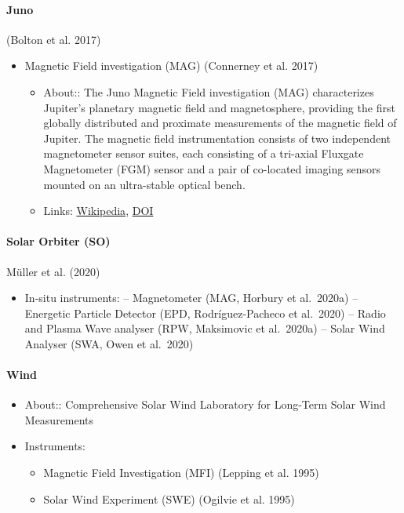 \documentclass[
  letterpaper,
  DIV=11,
  numbers=noendperiod,
  oneside]{scrartcl}
\let\oldparagraph\paragraph
\renewcommand{\paragraph}[1]{\oldparagraph{#1}\mbox{}}
\providecommand{\tightlist}{%
  \setlength{\itemsep}{0pt}\setlength{\parskip}{0pt}}\usepackage{longtable,booktabs,array}
\begin{document}
\paragraph{Juno}

(Bolton et al. 2017)

\begin{itemize}
\tightlist
\item
  Magnetic Field investigation (MAG) (Connerney et al. 2017)

  \begin{itemize}
  \tightlist
  \item
    About:: The Juno Magnetic Field investigation (MAG) characterizes
    Jupiter's planetary magnetic field and magnetosphere, providing the
    first globally distributed and proximate measurements of the
    magnetic field of Jupiter. The magnetic field instrumentation
    consists of two independent magnetometer sensor suites, each
    consisting of a tri-axial Fluxgate Magnetometer (FGM) sensor and a
    pair of co-located imaging sensors mounted on an ultra-stable
    optical bench.
  \item
    Links:
    \href{https://www.wikiwand.com/en/Magnetometer_(Juno)}{Wikipedia},
    \href{https://doi.org/10.1007/s11214-017-0334-z}{DOI}
  \end{itemize}
\end{itemize}

\paragraph{Solar Orbiter (SO)}

Müller et al. (2020)

\begin{itemize}
\tightlist
\item
  In-situ instruments: -- Magnetometer (MAG, Horbury et al.~2020a) --
  Energetic Particle Detector (EPD, Rodríguez-Pacheco et al.~2020) --
  Radio and Plasma Wave analyser (RPW, Maksimovic et al.~2020a) -- Solar
  Wind Analyser (SWA, Owen et al.~2020)
\end{itemize}

\paragraph{Wind}

\begin{itemize}
\tightlist
\item
  About:: Comprehensive Solar Wind Laboratory for Long-Term Solar Wind
  Measurements
\item
  Instruments:

  \begin{itemize}
  \tightlist
  \item
    Magnetic Field Investigation (MFI) (Lepping et al. 1995)
  \item
    Solar Wind Experiment (SWE) (Ogilvie et al. 1995)
  \end{itemize}
\end{itemize}
\end{document}
